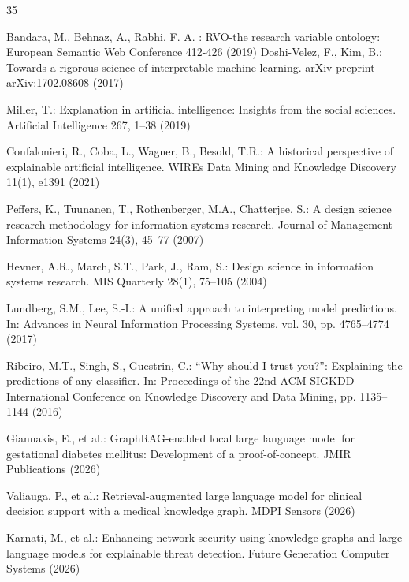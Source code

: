 \documentclass[lnbip]{svmultln}
\begin{document}
%
\begin{thebibliography}{35}


  Bandara, M., Behnaz, A., Rabhi, F. A. : RVO-the research variable ontology:  European Semantic Web Conference 412-426 (2019)
 Doshi-Velez, F., Kim, B.: Towards a rigorous science of interpretable machine learning. arXiv preprint arXiv:1702.08608 (2017)

 Miller, T.: Explanation in artificial intelligence: Insights from the social sciences. Artificial Intelligence 267, 1--38 (2019)

 Confalonieri, R., Coba, L., Wagner, B., Besold, T.R.: A historical perspective of explainable artificial intelligence. WIREs Data Mining and Knowledge Discovery 11(1), e1391 (2021)

 Peffers, K., Tuunanen, T., Rothenberger, M.A., Chatterjee, S.: A design science research methodology for information systems research. Journal of Management Information Systems 24(3), 45--77 (2007)

 Hevner, A.R., March, S.T., Park, J., Ram, S.: Design science in information systems research. MIS Quarterly 28(1), 75--105 (2004)

 Lundberg, S.M., Lee, S.-I.: A unified approach to interpreting model predictions. In: Advances in Neural Information Processing Systems, vol. 30, pp. 4765--4774 (2017)

 Ribeiro, M.T., Singh, S., Guestrin, C.: ``Why should I trust you?'': Explaining the predictions of any classifier. In: Proceedings of the 22nd ACM SIGKDD International Conference on Knowledge Discovery and Data Mining, pp. 1135--1144 (2016)


 Giannakis, E., et al.: GraphRAG-enabled local large language model for gestational diabetes mellitus: Development of a proof-of-concept. JMIR Publications (2026)

 Valiauga, P., et al.: Retrieval-augmented large language model for clinical decision support with a medical knowledge graph. MDPI Sensors (2026)

 Karnati, M., et al.: Enhancing network security using knowledge graphs and large language models for explainable threat detection. Future Generation Computer Systems (2026)


\end{thebibliography}
\end{document}
